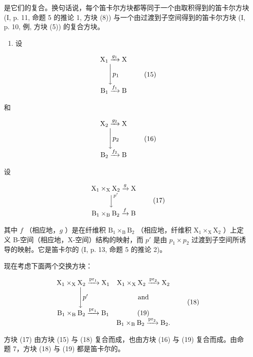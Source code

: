 是它们的复合。换句话说，每个笛卡尔方块都等同于一个由取积得到的笛卡尔方块 (I, p. 11, 命题 5 的推论 1, 方块 (8)) 与一个由过渡到子空间得到的笛卡尔方块 (I, p. 10, 例, 方块 (5)) 的复合方块。

\begin{enumerate}
\def\labelenumi{\arabic{enumi})}
\setcounter{enumi}{2}
\tightlist
\item
  设
\end{enumerate}

\[
\begin{array}{c} \mathrm{X} _ {1} \xrightarrow {g _ {1}} \mathrm{X} \\ \Biggl \downarrow p _ {1} \\ \mathrm{B} _ {1} \xrightarrow {f _ {1}} \mathrm{B} \end{array}\tag{15}
\]

和

\[
\begin{array}{c} \mathrm{X} _ {2} \xrightarrow {g _ {2}} \mathrm{X} \\ \Biggl \downarrow p _ {2} \\ \mathrm{B} _ {2} \xrightarrow {f _ {2}} \mathrm{B} \end{array}\tag{16}
\]

  设

\[
\begin{array}{c} \mathrm{X} _ {1} \times_ {\mathrm{X}} \mathrm{X} _ {2} \xrightarrow {g} \mathrm{X} \\ \Big \downarrow^ {p ^ {\prime}} \\ \mathrm{B} _ {1} \times_ {\mathrm{B}} \mathrm{B} _ {2} \xrightarrow {f} \mathrm{B} \end{array}\tag{17}
\]

其中 \(f\) （相应地，\(g\) ）是在纤维积 \(\mathrm{B}_{1} \times_{\mathrm{B}} \mathrm{B}_{2}\) （相应地，纤维积 \(\mathrm{X}_{1} \times_{\mathrm{X}} \mathrm{X}_{2}\) ）上定义 B-空间（相应地，X-空间）结构的映射，而 \(p'\) 是由 \(p_{1} \times p_{2}\) 过渡到子空间所诱导的映射。它是笛卡尔的 (I, p. 13, 命题 5 的推论 2)。

现在考虑下面两个交换方块：

\[
\begin{array}{c c} \mathrm{X} _ {1} \times_ {\mathrm{X}} \mathrm{X} _ {2} \xrightarrow {\operatorname{pr} _ {1}} \mathrm{X} _ {1} & \mathrm{X} _ {1} \times_ {\mathrm{X}} \mathrm{X} _ {2} \xrightarrow {\operatorname{pr} _ {2}} \mathrm{X} _ {2} \\ \Biggl \downarrow p ^ {\prime} & \text {and} \\ \mathrm{B} _ {1} \times_ {\mathrm{B}} \mathrm{B} _ {2} \xrightarrow {\operatorname{pr} _ {1}} \mathrm{B} _ {1} & \mathrm{(19)} \\ & \mathrm{B} _ {1} \times_ {\mathrm{B}} \mathrm{B} _ {2} \xrightarrow {\operatorname{pr} _ {2}} \mathrm{B} _ {2}. \end{array}\tag{18}
\]

方块 (17) 由方块 (15) 与 (18) 复合而成，也由方块 (16) 与 (19) 复合而成。由命题 7，方块 (18) 与 (19) 都是笛卡尔的。

